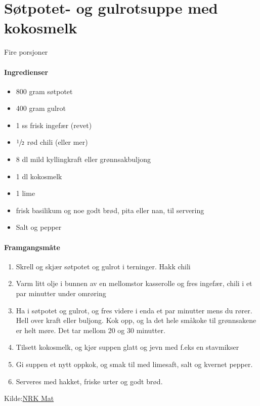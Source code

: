 \section{﻿Søtpotet- og gulrotsuppe med kokosmelk}
\label{sotpotetSuppe}
Fire porsjoner\\

\paragraph{Ingredienser}
\begin{itemize}[noitemsep]
	    	\item 800 gram søtpotet
	    	\item 400 gram gulrot
	    	\item 1 ss frisk ingefær (revet)
	    	\item $\sfrac{1}{2}$ rød chili (eller mer)
	    	\item 8 dl mild kyllingkraft eller grønnsakbuljong
	    	\item 1 dl kokosmelk
	    	\item 1 lime
	    	\item frisk basilikum og noe godt brød, pita eller nan, til servering
			  \item Salt og pepper
\end{itemize}

\paragraph{Framgangsmåte}
\begin{enumerate}[noitemsep]
	\item Skrell og skjær søtpotet og gulrot i terninger. Hakk chili
	\item Varm litt olje i bunnen av en mellomstor kasserolle  og fres ingefær, chili i et par minutter under omrøring
	\item Ha i søtpotet og gulrot, og fres videre i enda et par minutter mens du rører. Hell over kraft eller buljong. Kok opp, og la det hele småkoke til grønnsakene er helt møre. Det tar mellom 20 og 30 minutter.
	\item Tilsett kokosmelk, og kjør suppen glatt og jevn med f.eks en stavmikser
	\item Gi suppen et nytt oppkok, og smak til med limesaft, salt og kvernet pepper.
	\item Serveres med hakket, friske urter og godt brød.
\end{enumerate}

Kilde:\href{https://www.nrk.no/mat/sotpotet--og-gulrotsuppe-med-kokosmelk-1.13146935}{NRK Mat}
